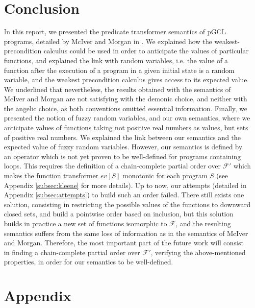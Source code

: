 \documentclass[a4paper,10pt]{llncs}
\begin{document}
\section{Conclusion}
\label{sec:conclusion}
In this report, we presented the predicate transformer semantics of pGCL programs, detailed by McIver and Morgan in \cite{McIver05}. We explained how the weakest-precondition calculus could be used in order to anticipate the values of particular functions, and explained the link with random variables, i.e. the value of a function after the execution of a program in a given initial state is a random variable, and the weakest precondition calculus gives access to its expected value. We underlined that nevertheless, the results obtained with the semantics of McIver and Morgan are not satisfying with the demonic choice, and neither with the angelic choice, as both conventions omitted essential information. Finally, we presented the notion of fuzzy random variables, and our own semantics, where we anticipate values of functions taking not positive real numbers as values, but sets of positive real numbers. We explained the link between our semantics and the expected value of fuzzy random variables.\newline
However, our semantics is defined by an operator which is not yet proven to be well-defined for programs containing loops.
This requires the definition of a chain-complete partial order over $\mathcal{F}'$ which makes the function transformer $ev[S]$ monotonic for each program $S$ (see Appendix \ref{subsec:kleene} for more details). Up to now, our attempts (detailed in Appendix \ref{subsec:attempts}) to build such an order failed. There still exists one solution, consisting in restricting the possible values of the functions to downward closed sets, and build a pointwise order based on inclusion, but this solution builds in practice a new set of functions isomorphic to $\mathcal{F}$, and the resulting semantics suffers from the same loss of information as in the semantics of McIver and Morgan.\newline
Therefore, the most important part of the future work will consist in finding a chain-complete partial order over $\mathcal{F}'$, verifying the above-mentioned properties, in order for our semantics to be well-defined.


{}


\newpage
\section{Appendix}
\label{sec:appendix}
\end{document}
